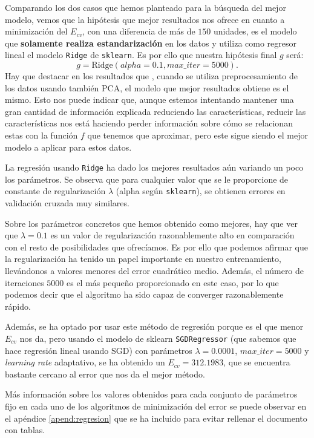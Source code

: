 \documentclass[a4paper, 20pt]{article}
\begin{document}
Comparando los dos casos que hemos planteado para la búsqueda del mejor modelo, vemos que la hipótesis que mejor resultados nos ofrece en cuanto a minimización del $E_{cv}$, con una diferencia de más de $150$ unidades, es el modelo que \textbf{solamente realiza estandarización} en los datos y utiliza como regresor lineal el modelo \lstinline{Ridge} de \lstinline{sklearn}. Es por ello que nuestra hipótesis final $g$ será:
$$
g = \text{Ridge}(alpha = 0.1, max\_iter = 5000).
$$
Hay que destacar en los resultados que , cuando se utiliza preprocesamiento de los datos usando también PCA, el modelo que mejor resultados obtiene es el mismo. Esto nos puede indicar que, aunque estemos intentando mantener una gran cantidad de información explicada reduciendo las características, reducir las características nos está haciendo perder información sobre cómo se relacionan estas con la función $f$ que tenemos que aproximar, pero este sigue siendo el mejor modelo a aplicar para estos datos.

La regresión usando \lstinline{Ridge} ha dado los mejores resultados aún variando un poco los parámetros. Se observa que para cualquier valor que se le proporcione de constante de regularización $\lambda$ (alpha según \lstinline{sklearn}), se obtienen errores en validación cruzada muy similares. 

Sobre los parámetros concretos que hemos obtenido como mejores, hay que ver que $\lambda = 0.1$ es un valor de regularización razonablemente alto en comparación con el resto de posibilidades que ofrecíamos. Es por ello que podemos afirmar que la regularización ha tenido un papel importante en nuestro entrenamiento, llevándonos a valores menores del error cuadrático medio. Además, el número de iteraciones $5000$ es el más pequeño proporcionado en este caso, por lo que podemos decir que el algoritmo ha sido capaz de converger razonablemente rápido.

Además, se ha optado por usar este método de regresión porque es el que menor $E_{cv}$ nos da, pero usando el modelo de sklearn \lstinline{SGDRegressor} (que sabemos que hace regresión lineal usando SGD) con parámetros $\lambda = 0.0001$, $max\_iter = 5000$ y \emph{learning rate} adaptativo, se ha obtenido un $E_{cv} = 312.1983$, que se encuentra bastante cercano al error que nos da el mejor método.

Más información sobre los valores obtenidos para cada conjunto de parámetros fijo en cada uno de los algoritmos de minimización del error se puede observar en el apéndice \ref{apend:regresion} que se ha incluido para evitar rellenar el documento con tablas.
\end{document}
